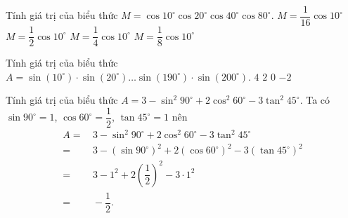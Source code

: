 \begin{ex}%
	Tính giá trị  của biểu thức $M = \cos 10^\circ \cos 20^\circ \cos 40^\circ \cos 80^\circ$.
	 \choice
		{$M=\dfrac{1}{16}\cos  10^\circ$}
		{$M=\dfrac{1}{2}\cos  10^\circ$}
		{$M=\dfrac{1}{4}\cos 10^\circ$} 
		{\True $M=\dfrac{1}{8}\cos 10^\circ$} 
\end{ex}

\begin{ex}%
	Tính giá trị của biểu thức $A=\sin (10^{\circ})\cdot \sin (20^{\circ})\ldots \sin (190^{\circ})\cdot \sin (200^{\circ})$. 
	\choice 
		{$4$} 
		{$2$} 
		 {\True $0$}
		{$-2$} 
\end{ex}

\begin{bt}[Mức độ 2]%
	Tính giá trị của biểu thức $A=3-\sin^2{90^\circ}+2\cos^2{60^\circ}-3\tan^2{45^\circ}$.
	\loigiai
	{Ta có $\sin90^\circ=1$, $\cos60^\circ=\dfrac{1}{2}$, $\tan45^\circ=1$ nên
		\allowdisplaybreaks
		\begin{align*}
			A=&\, 3-\sin^2{90^\circ}+2\cos^2{60^\circ}-3\tan^2{45^\circ}\\
			=&\, 3-\left(\sin90^\circ\right)^2 + 2\left(\cos60^\circ\right)^2 - 3\left(\tan45^\circ\right)^2\\
			=&\, 3-1^2+2\left(\dfrac{1}{2}\right)^2-3\cdot 1^2\\
			=&\, -\dfrac{1}{2}.
	\end{align*}}
\end{bt}

